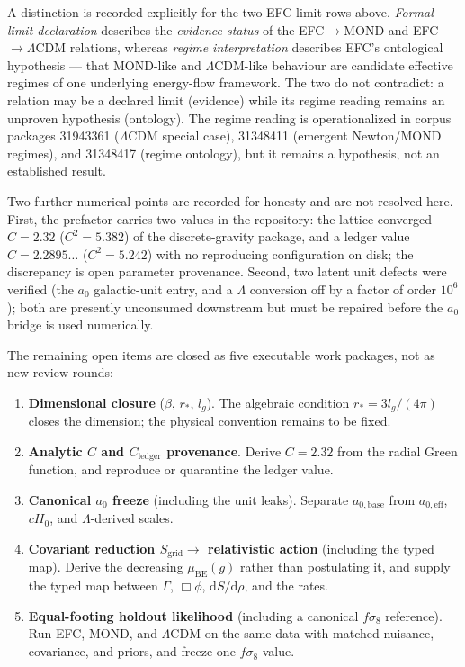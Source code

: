 \documentclass[11pt,a4paper]{article}
\begin{document}
A distinction is recorded explicitly for the two EFC-limit rows above.
\emph{Formal-limit declaration} describes the \emph{evidence status} of the
EFC$\to$MOND and EFC$\to\Lambda$CDM relations, whereas \emph{regime
interpretation} describes EFC's ontological hypothesis --- that MOND-like and
$\Lambda$CDM-like behaviour are candidate effective regimes of one underlying
energy-flow framework. The two do not contradict: a relation may be a declared
limit (evidence) while its regime reading remains an unproven hypothesis
(ontology). The regime reading is operationalized in corpus packages 31943361
($\Lambda$CDM special case), 31348411 (emergent Newton/MOND regimes), and
31348417 (regime ontology), but it remains a hypothesis, not an established
result.

Two further numerical points are recorded for honesty and are not resolved
here. First, the prefactor carries two values in the repository: the
lattice-converged $C = 2.32$ ($C^2 = 5.382$) of the discrete-gravity package,
and a ledger value $C = 2.2895\ldots$ ($C^2 = 5.242$) with no reproducing
configuration on disk; the discrepancy is open parameter provenance. Second,
two latent unit defects were verified (the $a_0$ galactic-unit entry, and a
$\Lambda$ conversion off by a factor of order $10^6$); both are presently
unconsumed downstream but must be repaired before the $a_0$ bridge is used
numerically.

The remaining open items are closed as five executable work packages, not as
new review rounds:

\begin{enumerate}
\item \textbf{Dimensional closure} ($\beta$, $r_*$, $l_g$). The algebraic
  condition $r_* = 3 l_g/(4\pi)$ closes the dimension; the physical convention
  remains to be fixed.
\item \textbf{Analytic $C$ and $C_{\mathrm{ledger}}$ provenance}. Derive
  $C = 2.32$ from the radial Green function, and reproduce or quarantine the
  ledger value.
\item \textbf{Canonical $a_0$ freeze} (including the unit leaks). Separate
  $a_{0,\mathrm{base}}$ from $a_{0,\mathrm{eff}}$, $cH_0$, and $\Lambda$-derived
  scales.
\item \textbf{Covariant reduction $S_{\mathrm{grid}} \to$ relativistic action}
  (including the typed map). Derive the decreasing $\mu_{\mathrm{BE}}(g)$ rather
  than postulating it, and supply the typed map between $\Gamma$, $\Box\phi$,
  $\mathrm{d}S/\mathrm{d}\rho$, and the rates.
\item \textbf{Equal-footing holdout likelihood} (including a canonical
  $f\sigma_8$ reference). Run EFC, MOND, and $\Lambda$CDM on the same data with
  matched nuisance, covariance, and priors, and freeze one $f\sigma_8$ value.
\end{enumerate}
\end{document}
